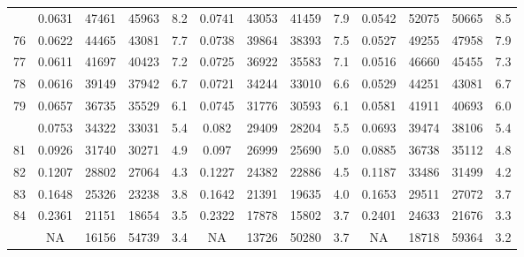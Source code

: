 \documentclass[
  14pt,
]{article}
\begin{document}
\begin{longtable}[t]{lcccccccccccc}
\addlinespace
75 & 0.0631 & 47461 & 45963 & 8.2 & 0.0741 & 43053 & 41459 & 7.9 & 0.0542 & 52075 & 50665 & 8.5\\
76 & 0.0622 & 44465 & 43081 & 7.7 & 0.0738 & 39864 & 38393 & 7.5 & 0.0527 & 49255 & 47958 & 7.9\\
77 & 0.0611 & 41697 & 40423 & 7.2 & 0.0725 & 36922 & 35583 & 7.1 & 0.0516 & 46660 & 45455 & 7.3\\
78 & 0.0616 & 39149 & 37942 & 6.7 & 0.0721 & 34244 & 33010 & 6.6 & 0.0529 & 44251 & 43081 & 6.7\\
79 & 0.0657 & 36735 & 35529 & 6.1 & 0.0745 & 31776 & 30593 & 6.1 & 0.0581 & 41911 & 40693 & 6.0\\
\addlinespace
80 & 0.0753 & 34322 & 33031 & 5.4 & 0.082 & 29409 & 28204 & 5.5 & 0.0693 & 39474 & 38106 & 5.4\\
81 & 0.0926 & 31740 & 30271 & 4.9 & 0.097 & 26999 & 25690 & 5.0 & 0.0885 & 36738 & 35112 & 4.8\\
82 & 0.1207 & 28802 & 27064 & 4.3 & 0.1227 & 24382 & 22886 & 4.5 & 0.1187 & 33486 & 31499 & 4.2\\
83 & 0.1648 & 25326 & 23238 & 3.8 & 0.1642 & 21391 & 19635 & 4.0 & 0.1653 & 29511 & 27072 & 3.7\\
84 & 0.2361 & 21151 & 18654 & 3.5 & 0.2322 & 17878 & 15802 & 3.7 & 0.2401 & 24633 & 21676 & 3.3\\
\addlinespace
85 & NA & 16156 & 54739 & 3.4 & NA & 13726 & 50280 & 3.7 & NA & 18718 & 59364 & 3.2\\*
\end{longtable}
\end{document}
